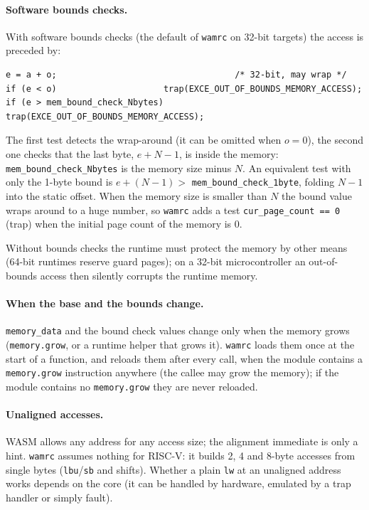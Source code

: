 \documentclass{article}
\begin{document}
\paragraph{Software bounds checks.}
With software bounds checks (the default of \texttt{wamrc} on 32-bit targets) the access is preceded by:
\begin{verbatim}
e = a + o;                                   /* 32-bit, may wrap */
if (e < o)                     trap(EXCE_OUT_OF_BOUNDS_MEMORY_ACCESS);
if (e > mem_bound_check_Nbytes) trap(EXCE_OUT_OF_BOUNDS_MEMORY_ACCESS);
\end{verbatim}
The first test detects the wrap-around (it can be omitted when $o = 0$), the second one checks that the last byte, $e + N - 1$, is inside the memory: \verb|mem_bound_check_Nbytes| is the memory size minus $N$.
An equivalent test with only the 1-byte bound is $e + (N-1) > $ \verb|mem_bound_check_1byte|, folding $N-1$ into the static offset.
When the memory size is smaller than $N$ the bound value wraps around to a huge number, so \texttt{wamrc} adds a test \verb|cur_page_count == 0| (trap) when the initial page count of the memory is 0.

Without bounds checks the runtime must protect the memory by other means (64-bit runtimes reserve guard pages); on a 32-bit microcontroller an out-of-bounds access then silently corrupts the runtime memory.

\paragraph{When the base and the bounds change.}
\verb|memory_data| and the bound check values change only when the memory grows (\verb|memory.grow|, or a runtime helper that grows it).
\texttt{wamrc} loads them once at the start of a function, and reloads them after every call, when the module contains a \verb|memory.grow| instruction anywhere (the callee may grow the memory); if the module contains no \verb|memory.grow| they are never reloaded.

\paragraph{Unaligned accesses.}
WASM allows any address for any access size; the alignment immediate is only a hint.
\texttt{wamrc} assumes nothing for RISC-V: it builds 2, 4 and 8-byte accesses from single bytes (\verb|lbu|/\verb|sb| and shifts).
Whether a plain \verb|lw| at an unaligned address works depends on the core (it can be handled by hardware, emulated by a trap handler or simply fault).
\end{document}
